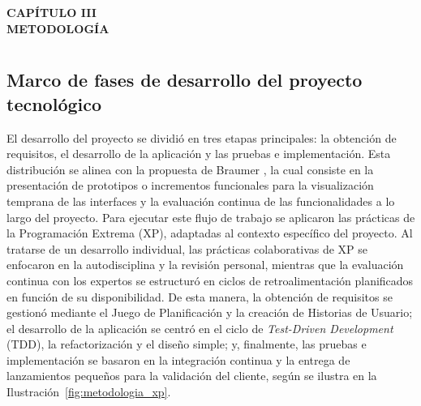 
\cleardoublepage
\thispagestyle{empty}
\vspace*{\fill}
\begin{center}
{\Large\bfseries CAPÍTULO III}\\[2.5cm]
{\Large\bfseries METODOLOGÍA}
\end{center}
\vspace*{\fill}
\clearpage

\chapter*{}
\setcounter{chapter}{3}
\setcounter{section}{0}
\renewcommand{\thesection}{3.\arabic{section}}
\renewcommand{\thesubsection}{3.\arabic{section}.\arabic{subsection}}

\vspace{-3cm}

\section{Marco de fases de desarrollo del proyecto tecnológico}

El desarrollo del proyecto se dividió en tres etapas principales: la obtención de requisitos, el desarrollo de la aplicación y las pruebas e implementación. Esta distribución se alinea con la propuesta de Braumer \cite{ref55_braumer}, la cual consiste en la presentación de prototipos o incrementos funcionales para la visualización temprana de las interfaces y la evaluación continua de las funcionalidades a lo largo del proyecto. Para ejecutar este flujo de trabajo se aplicaron las prácticas de la Programación Extrema (XP), adaptadas al contexto específico del proyecto. Al tratarse de un desarrollo individual, las prácticas colaborativas de XP se enfocaron en la autodisciplina y la revisión personal, mientras que la evaluación continua con los expertos se estructuró en ciclos de retroalimentación planificados en función de su disponibilidad. De esta manera, la obtención de requisitos se gestionó mediante el Juego de Planificación y la creación de Historias de Usuario; el desarrollo de la aplicación se centró en el ciclo de \textit{Test-Driven Development} (TDD), la refactorización y el diseño simple; y, finalmente, las pruebas e implementación se basaron en la integración continua y la entrega de lanzamientos pequeños para la validación del cliente, según se ilustra en la Ilustración~\ref{fig:metodologia_xp}.

